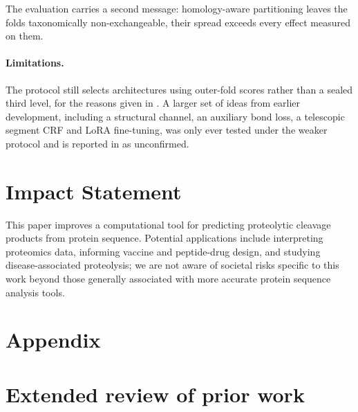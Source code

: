 \documentclass{article}
\begin{document}
The evaluation carries a second message: homology-aware partitioning leaves the folds taxonomically non-exchangeable, their spread exceeds every effect measured on them.

\paragraph{Limitations.} 
The protocol still selects architectures using outer-fold scores rather than a sealed third level, for the reasons given in . A larger set of ideas from earlier development, including a structural channel, an auxiliary bond loss, a telescopic segment CRF and LoRA fine-tuning, was only ever tested under the weaker protocol and is reported in  as unconfirmed.




\section*{Impact Statement}
This paper improves a computational tool for predicting proteolytic cleavage products from protein sequence. Potential applications include interpreting proteomics data, informing vaccine and peptide-drug design, and studying disease-associated proteolysis; we are not aware of societal risks specific to this work beyond those generally associated with more accurate protein sequence analysis tools.
\newpage
\appendix
\section*{Appendix}

\section{Extended review of prior work}
\label{sec:app-related}
\end{document}
